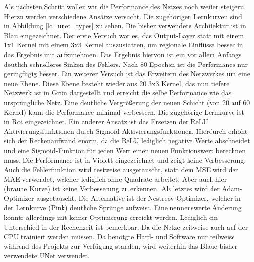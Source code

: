 Als nächsten Schritt wollen wir die Performance des Netzes noch weiter steigern. Hierzu werden verschiedene Ansätze versucht. Die zugehörigen Lernkurven sind in Abbildung \ref{lc_unet_types} zu sehen.
Die bisher verwendete Architektur ist in Blau eingezeichnet. Der erste Versuch war es, das Output-Layer statt mit einem 1x1 Kernel mit einem 3x3 Kernel auszustatten, um regionale Einflüsse besser in das Ergebnis mit aufzunehmen. Das Ergebnis hiervon ist ein vor allem Anfangs deutlich schnelleres Sinken des Fehlers. Nach 80 Epochen ist die Performance nur geringfügig besser. Ein weiterer Versuch ist das Erweitern des Netzwerkes um eine neue Ebene. Diese Ebene besteht wieder aus 20 3x3 Kernel, das nun tiefere Netzwerk ist in Grün dargestellt und erreicht die selbe Performance wie das ursprüngliche Netz. Eine deutliche Vergrößerung der neuen Schicht (von 20 auf 60 Kernel) kann die Performance minimal verbessern. Die zugehörige Lernkurve ist in Rot eingezeichnet. Ein anderer Ansatz ist das Ersetzen der ReLU Aktivierungsfunktionen durch Sigmoid Aktivierungsfunktionen. Hierdurch erhöht sich der Rechenaufwand enorm, da die ReLU lediglich negative Werte abschneidet und eine Sigmoid-Funktion für jeden Wert einen neuen Funktionswert berechnen muss. Die Performance ist in Violett eingezeichnet und zeigt keine Verbesserung. Auch die Fehlerfunktion wird testweise ausgetauscht, statt dem MSE wird der MAE verwendet, welcher lediglich ohne Quadrate arbeitet. Aber auch hier (braune Kurve) ist keine Verbesserung zu erkennen. Als letztes wird der Adam-Optimizer ausgetauscht. Die Alternative ist der Nestreov-Optimizer, welcher in der Lernkurve (Pink) deutliche Sprünge aufweist. Eine nennenswerte Änderung konnte allerdings mit keiner Optimierung erreicht werden. Lediglich ein Unterschied in der Rechenzeit ist bemerkbar. Da die Netze zeitweise auch auf der CPU trainiert werden müssen, Da benötgte Hard- und Software nur teilweise während des Projekts zur Verfügung standen, wird weiterhin das Blaue bisher verwendete UNet verwendet.

